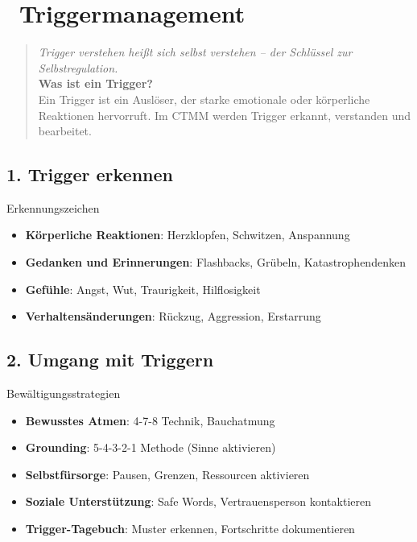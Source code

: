 
\newpage
\section*{\textcolor{ctmmOrange}{\faExclamationCircle~Triggermanagement}}
\label{sec:triggermanagement}

\begin{quote}
\textit{\textcolor{ctmmOrange}{Trigger verstehen heißt sich selbst verstehen -- der Schlüssel zur Selbstregulation.}}\\
\textbf{\textcolor{ctmmOrange}{Was ist ein Trigger?}}\\
Ein Trigger ist ein Auslöser, der starke emotionale oder körperliche Reaktionen hervorruft. Im CTMM werden Trigger erkannt, verstanden und bearbeitet.
\end{quote}

\subsection*{\textcolor{ctmmOrange}{1. Trigger erkennen}}

\begin{ctmmOrangeBox}{Erkennungszeichen}
\begin{itemize}
  \item \textbf{Körperliche Reaktionen}: Herzklopfen, Schwitzen, Anspannung
  \item \textbf{Gedanken und Erinnerungen}: Flashbacks, Grübeln, Katastrophendenken
  \item \textbf{Gefühle}: Angst, Wut, Traurigkeit, Hilflosigkeit
  \item \textbf{Verhaltensänderungen}: Rückzug, Aggression, Erstarrung
\end{itemize}
\end{ctmmOrangeBox}

\subsection*{\textcolor{ctmmOrange}{2. Umgang mit Triggern}}

\begin{ctmmGreenBox}{Bewältigungsstrategien}
\begin{itemize}
  \item \textbf{Bewusstes Atmen}: 4-7-8 Technik, Bauchatmung
  \item \textbf{Grounding}: 5-4-3-2-1 Methode (Sinne aktivieren)
  \item \textbf{Selbstfürsorge}: Pausen, Grenzen, Ressourcen aktivieren
  \item \textbf{Soziale Unterstützung}: Safe Words, Vertrauensperson kontaktieren
  \item \textbf{Trigger-Tagebuch}: Muster erkennen, Fortschritte dokumentieren
\end{itemize}
\end{ctmmGreenBox}

